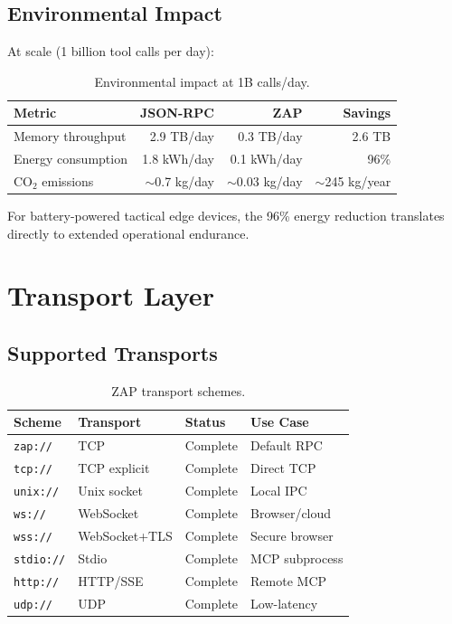 \documentclass[11pt,letterpaper]{article}
\begin{document}
\subsection{Environmental Impact}

At scale (1 billion tool calls per day):

\begin{table}[H]
\centering
\begin{tabular}{@{}lrrr@{}}
\toprule
\textbf{Metric} & \textbf{JSON-RPC} & \textbf{ZAP} & \textbf{Savings} \\
\midrule
Memory throughput & 2.9 TB/day & 0.3 TB/day & 2.6 TB \\
Energy consumption & 1.8 kWh/day & 0.1 kWh/day & 96\% \\
CO$_2$ emissions & $\sim$0.7 kg/day & $\sim$0.03 kg/day & $\sim$245 kg/year \\
\bottomrule
\end{tabular}
\caption{Environmental impact at 1B calls/day.}
\label{tab:environmental}
\end{table}

For battery-powered tactical edge devices, the 96\% energy reduction translates directly to extended operational endurance.

\section{Transport Layer}

\subsection{Supported Transports}

\begin{table}[H]
\centering
\begin{tabular}{@{}lllp{4cm}@{}}
\toprule
\textbf{Scheme} & \textbf{Transport} & \textbf{Status} & \textbf{Use Case} \\
\midrule
\texttt{zap://} & TCP & Complete & Default RPC \\
\texttt{tcp://} & TCP explicit & Complete & Direct TCP \\
\texttt{unix://} & Unix socket & Complete & Local IPC \\
\texttt{ws://} & WebSocket & Complete & Browser/cloud \\
\texttt{wss://} & WebSocket+TLS & Complete & Secure browser \\
\texttt{stdio://} & Stdio & Complete & MCP subprocess \\
\texttt{http://} & HTTP/SSE & Complete & Remote MCP \\
\texttt{udp://} & UDP & Complete & Low-latency \\
\bottomrule
\end{tabular}
\caption{ZAP transport schemes.}
\label{tab:transports}
\end{table}
\end{document}
